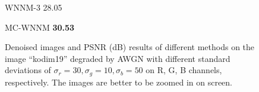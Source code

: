 \begin{figure}
{\begin{minipage}[t]{0.19\textwidth}
{\footnotesize WNNM-3 28.05}
\end{minipage}
\begin{minipage}[t]{0.19\textwidth}
\centering
{}
{\footnotesize MC-WNNM \textbf{30.53}}
\end{minipage}
}
    \caption{Denoised images and PSNR (dB) results of different methods on the image ``kodim19'' degraded by AWGN with different standard deviations of $\sigma_{r}=30, \sigma_{g}=10, \sigma_{b}=50$ on R, G, B channels, respectively. The images are better to be zoomed in on screen.}
    \label{fig4-5}
\end{figure}


